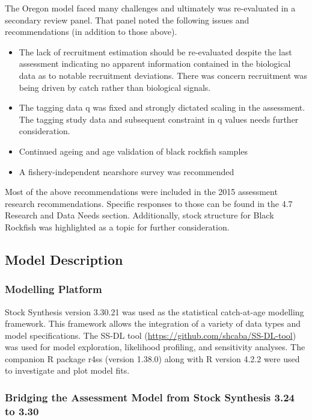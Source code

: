 \documentclass[11pt,
  english,
  letterpaper,
]{article}
\providecommand{\tightlist}{%
  \setlength{\itemsep}{0pt}\setlength{\parskip}{0pt}}
\providecommand{\tightlist}{%
  \setlength{\itemsep}{0pt}\setlength{\parskip}{0pt}}
\begin{document}
The Oregon model faced many challenges and ultimately was re-evaluated in a secondary review panel. That panel noted the following issues and recommendations (in addition to those above).

\begin{itemize}
\tightlist
\item
  The lack of recruitment estimation should be re-evaluated despite the last assessment indicating no apparent information contained in the biological data as to notable recruitment deviations. There was concern recruitment was being driven by catch rather than biological signals.
\item
  The tagging data q was fixed and strongly dictated scaling in the assessment. The tagging study data and subsequent constraint in q values needs further consideration.
\item
  Continued ageing and age validation of black rockfish samples
\item
  A fishery-independent nearshore survey was recommended
\end{itemize}

Most of the above recommendations were included in the 2015 assessment research recommendations. Specific responses to those can be found in the 4.7 Research and Data Needs section. Additionally, stock structure for Black Rockfish was highlighted as a topic for further consideration.

\hypertarget{model-description}{%
\subsection{Model Description}\label{model-description}}

\hypertarget{modelling-platform}{%
\subsubsection{Modelling Platform}\label{modelling-platform}}

Stock Synthesis version 3.30.21 was used as the statistical catch-at-age modelling framework. This framework allows the integration of a variety of data types and model specifications. The SS-DL tool (\url{https://github.com/shcaba/SS-DL-tool}) was used for model exploration, likelihood profiling, and sensitivity analyses. The companion R package r4ss (version 1.38.0) along with R version 4.2.2 were used to investigate and plot model fits.

\hypertarget{bridging-the-assessment-model-from-stock-synthesis-3.24-to-3.30}{%
\subsubsection{Bridging the Assessment Model from Stock Synthesis 3.24 to 3.30}\label{bridging-the-assessment-model-from-stock-synthesis-3.24-to-3.30}}
\end{document}
